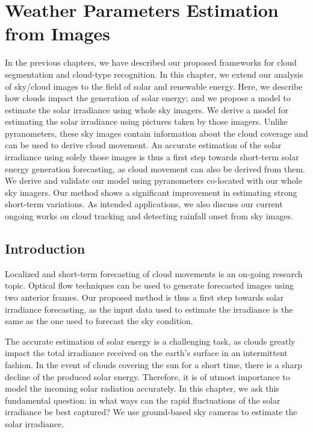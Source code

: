 \chapter{Weather Parameters Estimation from Images}
\label{chap:solar}

In the previous chapters, we have described our proposed frameworks for cloud segmentation and cloud-type recognition. In this chapter, we extend our analysis of sky/cloud images to the field of solar and renewable energy. Here, we describe how clouds impact the generation of solar energy; and we propose a model to estimate the solar irradiance using whole sky imagers. We derive a model for estimating the solar irradiance using pictures taken by those imagers. Unlike pyranometers, these sky images contain information about the cloud coverage and can be used to derive cloud movement. An accurate estimation of the solar irradiance using solely those images is thus a first step towards short-term solar energy generation forecasting, as cloud movement can also be derived from them. We derive and validate our model using pyranometers co-located with our whole sky imagers. Our method shows a significant improvement in estimating strong short-term variations. As intended applications, we also discuss our current ongoing works on cloud tracking and detecting rainfall onset from sky images. 

\section{Introduction}
Localized and short-term forecasting of cloud movements is an on-going research topic. Optical flow techniques can be used to generate forecasted images using two anterior frames. Our proposed method is thus a first step towards solar irradiance forecasting, as the input data used to estimate the irradiance is the same as the one used to forecast the sky condition.

The accurate estimation of solar energy is a challenging task, as clouds greatly impact the total irradiance received on the earth's surface in an intermittent fashion. In the event of clouds covering the sun for a short time, there is a sharp decline of the produced solar energy. Therefore, it is of utmost importance to model the incoming solar radiation accurately. In this chapter, we ask this fundamental question: in what ways can the rapid fluctuations of the solar irradiance be best captured? We use ground-based sky cameras to estimate the solar irradiance.

